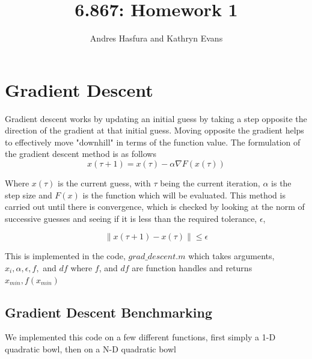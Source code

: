 \documentclass{article}
\begin{document}
\title{6.867: Homework 1}
\author{Andres Hasfura and Kathryn Evans}
\maketitle
\section{Gradient Descent}
Gradient descent works by updating an initial guess by taking a step opposite the direction of the gradient at that initial guess. Moving opposite the gradient helps  to effectively move "downhill" in terms of the function value.  The formulation of the gradient descent method is as follows
\begin{equation}
x(\tau+1) = x(\tau) - \alpha \nabla F(x(\tau))
\end{equation}

Where $ x(\tau)$ is the current guess, with $\tau$ being the current iteration, $\alpha$ is the step size and $F(x)$ is the function which will be evaluated. This method is carried out until there is convergence, which is checked by looking at the norm of successive guesses and seeing if it is less than the required tolerance, $\epsilon$,   



\begin{equation} 
\left \lVert x(\tau+1)-x(\tau) \right \rVert \leq \epsilon
\end{equation}

This is implemented in the code, $grad\_descent.m$ which takes arguments, $x_i, \alpha, \epsilon, f,$ and $df$ where $f$, and $df$ are function handles and returns $x_{min}, f(x_{min})$



\subsection*{ Gradient Descent Benchmarking}


We implemented this code on a few different functions, first simply a 1-D quadratic bowl, then on a N-D quadratic bowl 
\end{document}
